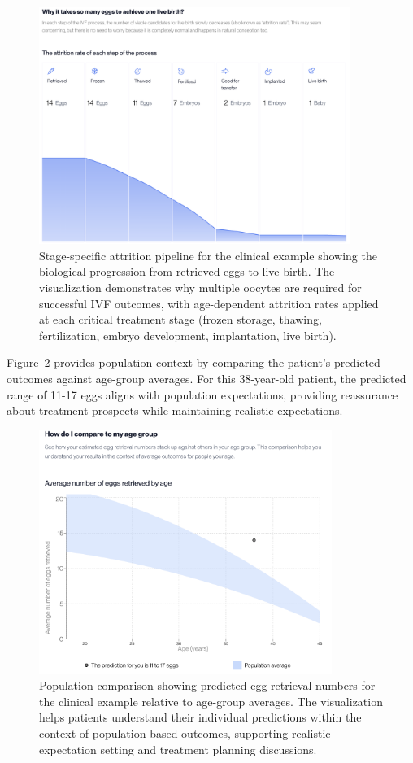 \begin{figure}[H]
    \centering
    \includegraphics[width=0.90\textwidth]{figures/Attrition.png}
    \caption{Stage-specific attrition pipeline for the clinical example showing the biological progression from retrieved eggs to live birth. The visualization demonstrates why multiple oocytes are required for successful IVF outcomes, with age-dependent attrition rates applied at each critical treatment stage (frozen storage, thawing, fertilization, embryo development, implantation, live birth).}
    \label{fig:attrition}
\end{figure}

Figure~\ref{fig:age_comparison} provides population context by comparing the patient's predicted outcomes against age-group averages. For this 38-year-old patient, the predicted range of 11-17 eggs aligns with population expectations, providing reassurance about treatment prospects while maintaining realistic expectations.

\begin{figure}[H]
    \centering
    \includegraphics[width=0.85\textwidth]{figures/AgeGroup.png}
    \caption{Population comparison showing predicted egg retrieval numbers for the clinical example relative to age-group averages. The visualization helps patients understand their individual predictions within the context of population-based outcomes, supporting realistic expectation setting and treatment planning discussions.}
    \label{fig:age_comparison}
\end{figure}

